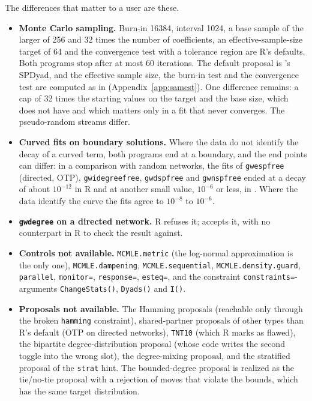 The differences that matter to a user are these.
\begin{itemize}
  \item \textbf{Monte Carlo sampling.} Burn-in 16384, interval 1024, a base sample of the larger of 256 and 32 times the number of coefficients, an effective-sample-size target of 64 and the convergence test with a tolerance region are R's defaults. Both programs stop after at most 60 iterations. The default proposal is \ergm{}'s SPDyad, and the effective sample size, the burn-in test and the convergence test are computed as in \ergm{} (Appendix~\ref{app:samest}). One difference remains: a cap of 32 times the starting values on the target and the base size, which \ergm{} does not have and which matters only in a fit that never converges. The pseudo-random streams differ.
  \item \textbf{Curved fits on boundary solutions.} Where the data do not identify the decay of a curved term, both programs end at a boundary, and the end points can differ: in a comparison with random networks, the fits of \texttt{gwespfree} (directed, OTP), \texttt{gwidegreefree}, \texttt{gwdspfree} and \texttt{gwnspfree} ended at a decay of about $10^{-12}$ in R and at another small value, $10^{-6}$ or less, in \nwergm{}. Where the data identify the curve the fits agree to $10^{-8}$ to $10^{-6}$.
  \item \textbf{\texttt{gwdegree} on a directed network.} R refuses it; \nwergm{} accepts it, with no counterpart in R to check the result against.
  \item \textbf{Controls not available.} \texttt{MCMLE.metric} (the log-normal approximation is the only one), \texttt{MCMLE.dampening}, \texttt{MCMLE.sequential}, \texttt{MCMLE.density.guard}, \texttt{parallel}, \texttt{monitor=}, \texttt{response=}, \texttt{esteq=}, and the constraint \texttt{constraints=}-arguments \texttt{ChangeStats()}, \texttt{Dyads()} and \texttt{I()}.
  \item \textbf{Proposals not available.} The Hamming proposals (reachable only through the broken \texttt{hamming} constraint), shared-partner proposals of other types than R's default (OTP on directed networks), \texttt{TNT10} (which R marks as flawed), the bipartite degree-distribution proposal (whose code writes the second toggle into the wrong slot), the degree-mixing proposal, and the stratified proposal of the \texttt{strat} hint. The bounded-degree proposal is realized as the tie/no-tie proposal with a rejection of moves that violate the bounds, which has the same target distribution.

\end{itemize}
